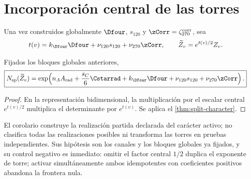 \section{Incorporación central de las torres}
\label{sec:factorizacion-split-torres}

Una vez construidos globalmente \(\Dfour\), \(s_{120}\) y
\(\zCorr=\zeta_{270}^{\rm corr}\), sea
\[
 t(v)=
 k_{\Dfour}\Dfour
 +\nu_{120}s_{120}
 +\nu_{270}\zCorr,
 \qquad
 \widetilde Z_v=e^{t(v)/2}Z_v.
\]

\begin{corollary}
\label{cor:split-character-torres}
Fijados los bloques globales anteriores,
\[
 \boxed{
 N_{\rm sp}(\widetilde Z_v)
 =\exp\!\left(
 n_AA_{\rm rad}+\frac{s_C}{6}\Cstarrad
 +k_{\Dfour}\Dfour+\nu_{120}s_{120}
 +\nu_{270}\zCorr
 \right).}
\]
\end{corollary}

\begin{proof}
En la representación bidimensional, la multiplicación por el escalar central
\(e^{t(v)/2}\) multiplica el determinante por \(e^{t(v)}\). Se aplica el
\cref{thm:split-character}.
\end{proof}

El corolario construye la realización partida declarada del carácter activo;
no clasifica todas las realizaciones posibles ni transforma las torres en
pruebas independientes. Sus hipótesis son los canales y los bloques globales
ya fijados, y su control negativo es inmediato: omitir el factor central
\(1/2\) duplica el exponente de torre; activar simultáneamente ambos
idempotentes con coeficientes positivos abandona la frontera nula.
